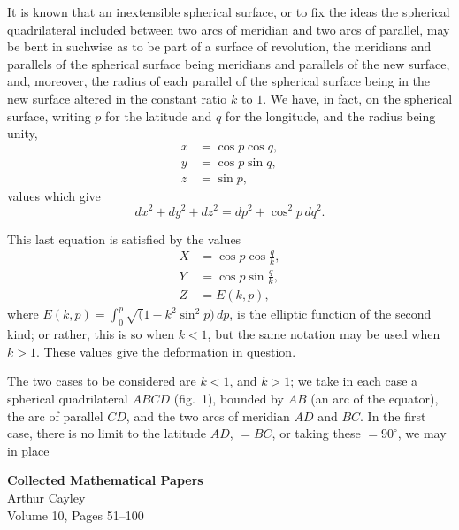 \documentclass[11pt,a4paper]{book}
\begin{document}
It is known that an inextensible spherical surface, or to fix the ideas the spherical quadrilateral included between two arcs of meridian and two arcs of parallel, may be bent in suchwise as to be part of a surface of revolution, the meridians and parallels of the spherical surface being meridians and parallels of the new surface, and, moreover, the radius of each parallel of the spherical surface being in the new surface altered in the constant ratio $k$ to $1$. We have, in fact, on the spherical surface, writing $p$ for the latitude and $q$ for the longitude, and the radius being unity,
\begin{align*}
x &= \cos p \cos q, \\
y &= \cos p \sin q, \\
z &= \sin p,
\end{align*}
values which give
\[
dx^2 + dy^2 + dz^2 = dp^2 + \cos^2 p\, dq^2.
\]

This last equation is satisfied by the values
\begin{align*}
X &= \cos p \cos\tfrac{q}{k}, \\
Y &= \cos p \sin\tfrac{q}{k}, \\
Z &= E(k, p),
\end{align*}
where $E(k, p) = \int_0^p \surd(1 - k^2 \sin^2 p)\, dp$, is the elliptic function of the second kind; or rather, this is so when $k < 1$, but the same notation may be used when $k > 1$. These values give the deformation in question.

The two cases to be considered are $k < 1$, and $k > 1$; we take in each case a spherical quadrilateral $ABCD$ (fig.~1), bounded by $AB$ (an arc of the equator), the arc of parallel $CD$, and the two arcs of meridian $AD$ and $BC$. In the first case, there is no limit to the latitude $AD$, $= BC$, or taking these $= 90^\circ$, we may in place
\clearpage


\begin{center}
{\LARGE\bfseries Collected Mathematical Papers}\\[1em]
{\Large Arthur Cayley}\\[1em]
{\large Volume 10, Pages 51--100}
\end{center}

\vspace{2em}
\end{document}
